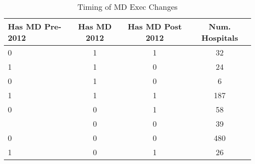 \begin{table}[ht!]
\centering
\caption{\label{change_timing}Timing of MD Exec Changes}
\centering
\begin{tabular}[t]{lccc}
\toprule
Has MD Pre-2012 & Has MD 2012 & Has MD Post 2012 & Num. Hospitals\\
\midrule
0 & 1 & 1 & 32\\
1 & 1 & 0 & 24\\
0 & 1 & 0 & 6\\
1 & 1 & 1 & 187\\
0 & 0 & 1 & 58\\
\addlinespace
1 & 0 & 0 & 39\\
0 & 0 & 0 & 480\\
1 & 0 & 1 & 26\\
\bottomrule
\end{tabular}
\end{table}

